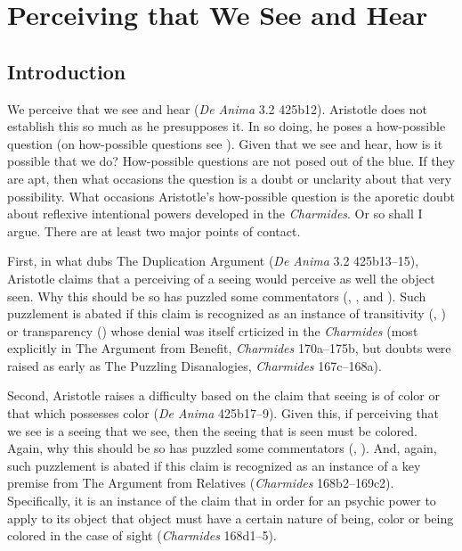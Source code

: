 \chapter{Perceiving that We See and Hear} %
\label{cha:perceiving}

\section{Introduction} %
\label{sec:introduction2}

We perceive that we see and hear (\emph{De Anima} 3.2 425b12). Aristotle does not establish this so much as he presupposes it. In so doing, he poses a how-possible question (on how-possible questions see \citealt{Cassam:2007lq}). Given that we see and hear, how is it possible that we do? How-possible questions are not posed out of the blue. If they are apt, then what occasions the question is a doubt or unclarity about that very possibility. What occasions Aristotle's how-possible question is the aporetic doubt about reflexive intentional powers developed in the \emph{Charmides}. Or so shall I argue. There are at least two major points of contact. 

First, in what \citet{caston02} dubs The Duplication Argument (\emph{De Anima} 3.2 425b13–15), Aristotle claims that a perceiving of a seeing would perceive as well the object seen. Why this should be so has puzzled some commentators (\citealt[435]{Hicks:1907uq}, \citealt[121–2]{Hamlyn:2002ys}, and \citealt[44–5]{Kosman:2014ab}). Such puzzlement is abated if this claim is recognized as an instance of transitivity (\citealt{McCabe:2007ss}, \citealt{McCabe:2007jb}) or transparency (\citealt{Tsouna:2022aa}) whose denial was itself crticized in the \emph{Charmides} (most explicitly in The Argument from Benefit, \emph{Charmides} 170a–175b, but doubts were raised as early as The Puzzling Disanalogies, \emph{Charmides} 167c–168a).

Second, Aristotle raises a difficulty based on the claim that seeing is of color or that which possesses color (\emph{De Anima} 425b17–9). Given this, if perceiving that we see is a seeing that we see, then the seeing that is seen must be colored. Again, why this should be so has puzzled some commentators (\citealt[122]{Hamlyn:2002ys}, \citealt[45–6]{Kosman:2014ab}). And, again, such puzzlement is abated if this claim is recognized as an instance of a key premise from The Argument from Relatives (\emph{Charmides} 168b2–169c2). Specifically, it is an instance of the claim that in order for an psychic power to apply to its object that object must have a certain nature of being, color or being colored in the case of sight (\emph{Charmides} 168d1–5).


